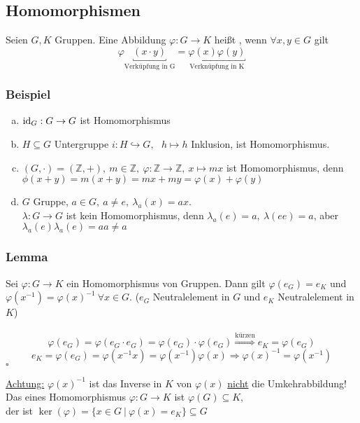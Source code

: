 \subsection{Homomorphismen}
\label{sub:homomorphismen}
Seien $G,K$ Gruppen. Eine Abbildung $\varphi: G \to K$ heißt , wenn $\forall x,y \in G$ gilt
\[\varphi\underbracket{(x\cdot y)}_{\text{Verküpfung in G} } =\underbracket{\varphi(x)\varphi(y)}_{\text{Verknüpfung in K}} \]

\subsubsection*{Beispiel}
\begin{enumerate}[(a)]
	\item $\operatorname{id}_G: G \to G$ ist Homomorphismus
	\item $H \subseteq G$ Untergruppe   $i:H \hookrightarrow G,~~~h \mapsto h$ Inklusion, ist Homomorphismus.
	\item $(G,\cdot)=(\mathds{Z},+),~ m\in \mathds{Z},~ \varphi:\mathds{Z} \to \mathds{Z},~ x\mapsto mx$ ist Homomorphismus, denn $\phi(x+y)=m(x+y)=mx+my=\varphi(x)+\varphi(y)$
	\item $G$ Gruppe, $a \in G,~ a\not= e,~ \lambda_a(x)=ax$.\\
	$\lambda: G \to G$ ist kein Homomorphismus, denn $\lambda_a(e)=a,~ \lambda(ee)=a$, aber $\lambda_a(e)\lambda_a(e)=aa\not=a$
\end{enumerate}

\subsubsection*{Lemma}
Sei $\varphi:G \to K$ ein Homomorphismus von Gruppen. Dann gilt $\varphi(e_G)=e_K$ und $\varphi(x^{-1})=\varphi(x)^{-1}~\forall x \in G$. ($e_G$ Neutralelement in $G$ und $e_K$ Neutralelement in $K$)\\
\\
\[
	\varphi(e_G)=\varphi(e_G \cdot e_G)=\varphi(e_G) \cdot \varphi(e_G)
	\stackrel{\text{kürzen}}{\Rightarrow} e_K=\varphi(e_G)
\]
\[
	e_K=\varphi(e_G)=\varphi(x^{-1}x)=\varphi(x^{-1})\varphi(x) \Rightarrow \varphi(x)^{-1}=\varphi(x^{-1})
\]
\hfill $\square$

\uline{Achtung:} $\varphi(x)^{-1}$ ist das Inverse in $K$ von $\varphi(x)$ \uline{nicht} die Umkehrabbildung!\\

Das  eines Homomorphismus $\varphi:G \to K$ ist $\varphi(G)\subseteq K$,\\
der  ist $\ker(\varphi)=\{x \in G~|~\varphi(x)=e_K \}\subseteq G$

